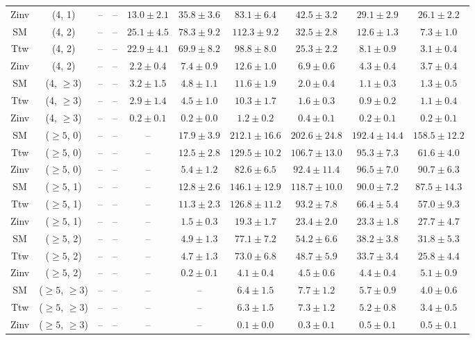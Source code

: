 \begin{table}[h!]
{\begin{tabular}{cccccccccc}
	Zinv & (4, 1) & -- & -- & $13.0\pm 2.1$ & $35.8\pm 3.6$ & $83.1\pm 6.4$ & $42.5\pm 3.2$ & $29.1\pm 2.9$ & $26.1\pm 2.2$ \\[0.5ex] 
	SM & (4, 2) & -- & -- & $25.1\pm 4.5$ & $78.3\pm 9.2$ & $112.3\pm 9.2$ & $32.5\pm 2.8$ & $12.6\pm 1.3$ & $7.3\pm 1.0$ \\[0.5ex] 
	Ttw & (4, 2) & -- & -- & $22.9\pm 4.1$ & $69.9\pm 8.2$ & $98.8\pm 8.0$ & $25.3\pm 2.2$ & $8.1\pm 0.9$ & $3.1\pm 0.4$ \\[0.5ex] 
	Zinv & (4, 2) & -- & -- & $2.2\pm 0.4$ & $7.4\pm 0.9$ & $12.6\pm 1.0$ & $6.9\pm 0.6$ & $4.3\pm 0.4$ & $3.7\pm 0.4$ \\[0.5ex] 
	SM & (4, $\ge3$) & -- & -- & $3.2\pm 1.5$ & $4.8\pm 1.1$ & $11.6\pm 1.9$ & $2.0\pm 0.4$ & $1.1\pm 0.3$ & $1.3\pm 0.5$ \\[0.5ex] 
	Ttw & (4, $\ge3$) & -- & -- & $2.9\pm 1.4$ & $4.5\pm 1.0$ & $10.3\pm 1.7$ & $1.6\pm 0.3$ & $0.9\pm 0.2$ & $1.1\pm 0.4$ \\[0.5ex] 
	Zinv & (4, $\ge3$) & -- & -- & $0.2\pm 0.1$ & $0.2\pm 0.0$ & $1.2\pm 0.2$ & $0.4\pm 0.1$ & $0.2\pm 0.1$ & $0.2\pm 0.1$ \\[0.5ex] 
	SM & ($\ge5$, 0) & -- & -- & -- & $17.9\pm 3.9$ & $212.1\pm 16.6$ & $202.6\pm 24.8$ & $192.4\pm 14.4$ & $158.5\pm 12.2$ \\[0.5ex] 
	Ttw & ($\ge5$, 0) & -- & -- & -- & $12.5\pm 2.8$ & $129.5\pm 10.2$ & $106.7\pm 13.0$ & $95.3\pm 7.3$ & $61.6\pm 4.0$ \\[0.5ex] 
	Zinv & ($\ge5$, 0) & -- & -- & -- & $5.4\pm 1.2$ & $82.6\pm 6.5$ & $92.4\pm 11.4$ & $96.5\pm 7.0$ & $90.7\pm 6.3$ \\[0.5ex] 
	SM & ($\ge5$, 1) & -- & -- & -- & $12.8\pm 2.6$ & $146.1\pm 12.9$ & $118.7\pm 10.0$ & $90.0\pm 7.2$ & $87.5\pm 14.3$ \\[0.5ex] 
	Ttw & ($\ge5$, 1) & -- & -- & -- & $11.3\pm 2.3$ & $126.8\pm 11.2$ & $93.2\pm 7.8$ & $66.4\pm 5.4$ & $57.0\pm 9.3$ \\[0.5ex] 
	Zinv & ($\ge5$, 1) & -- & -- & -- & $1.5\pm 0.3$ & $19.3\pm 1.7$ & $23.4\pm 2.0$ & $23.3\pm 1.8$ & $27.7\pm 4.7$ \\[0.5ex] 
	SM & ($\ge5$, 2) & -- & -- & -- & $4.9\pm 1.3$ & $77.1\pm 7.2$ & $54.2\pm 6.6$ & $38.2\pm 3.8$ & $31.8\pm 5.3$ \\[0.5ex] 
	Ttw & ($\ge5$, 2) & -- & -- & -- & $4.7\pm 1.3$ & $73.0\pm 6.8$ & $48.7\pm 5.9$ & $33.7\pm 3.4$ & $25.8\pm 4.4$ \\[0.5ex] 
	Zinv & ($\ge5$, 2) & -- & -- & -- & $0.2\pm 0.1$ & $4.1\pm 0.4$ & $4.5\pm 0.6$ & $4.4\pm 0.4$ & $5.1\pm 0.9$ \\[0.5ex] 
	SM & ($\ge5$, $\ge3$) & -- & -- & -- & -- & $6.4\pm 1.5$ & $7.7\pm 1.2$ & $5.7\pm 0.9$ & $4.0\pm 0.6$ \\[0.5ex] 
	Ttw & ($\ge5$, $\ge3$) & -- & -- & -- & -- & $6.3\pm 1.5$ & $7.3\pm 1.2$ & $5.2\pm 0.8$ & $3.4\pm 0.5$ \\[0.5ex] 
	Zinv & ($\ge5$, $\ge3$) & -- & -- & -- & -- & $0.1\pm 0.0$ & $0.3\pm 0.1$ & $0.5\pm 0.1$ & $0.5\pm 0.1$ \\[0.5ex] 
	\hline
	\hline
\end{tabular}}
\end{table}
